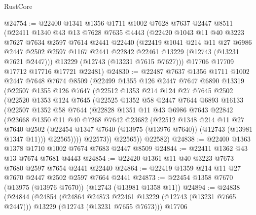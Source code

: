 \begin{lexlean}{RustCore}
\begin{coremodule}
@24754 := @22400
    @1341
    @1356
    @1711
    @1002
    @7628
    @7637
    @2447
    @8511
    (@22411
      @1340
      @43
      @13
      @7628
      @7635
      @4443
      (@22420
        @1043
        @11
        @40
        @3223
        @7627
        @7634
        @2597
        @7614
        @2441
        @22440
        (@22419
          @1041
          @214
          @11
          @27
          @6986
          @2447
          @2502
          @2597
          @1167
          @2441
          @22842
          @22461
          @13229
          (@12743 (@13231 @7621 @2447)))
        @13229
        (@12743 (@13231 @7615 @7627)))
      @17706
      @17709
      @17712
      @17716
      @17721
      @22481)
@24830 := @22487
    @7637
    @1356
    @1711
    @1002
    @2447
    @7648
    @7674
    @8509
    (@22499
      @1355
      @126
      @2447
      @7647
      @6890
      @13319
      (@22507
        @1355
        @126
        @7647
        (@22512
          @1353
          @214
          @124
          @27
          @7645
          @2502
          (@22520
            @1353
            @124
            @7645
            (@22525
              @1352
              @58
              @2447
              @7644
              @6893
              @16133
              (@22507
                @1352
                @58
                @7644
                (@22828
                  @1351
                  @11
                  @43
                  @6986
                  @7643
                  @22842
                  (@23668
                    @1350
                    @11
                    @40
                    @7268
                    @7642
                    @23682
                    (@22512
                      @1348
                      @214
                      @11
                      @27
                      @7640
                      @2502
                      (@22454 @1347 @7640 (@13975 (@13976 @7640)) (@12743 (@13981 @1347 @11)))
                      @22565))))
              @22573))
          @22565))
      @22582)
@24838 := @22400 @1363 @1378 @1710 @1002 @7674 @7683 @2447 @8509
@24844 := @22411 @1362 @43 @13 @7674 @7681 @4443
@24854 := @22420 @1361 @11 @40 @3223 @7673 @7680 @2597 @7654 @2441 @22440
@24864 := @22419 @1359 @214 @11 @27 @7670 @2447 @2502 @2597 @7664 @2441
@24873 := @22454 @1358 @7670 (@13975 (@13976 @7670)) (@12743 (@13981 @1358 @11))
@24894 := @24838
    (@24844
      (@24854
        (@24864 @24873 @22461 @13229 (@12743 (@13231 @7665 @2447)))
        @13229
        (@12743 (@13231 @7655 @7673)))
      @17706

\end{coremodule}
\end{lexlean}

